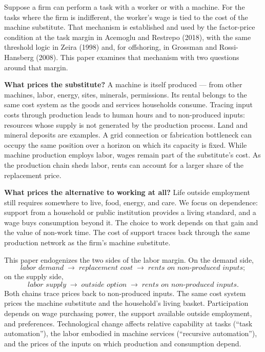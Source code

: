 \documentclass[12pt]{article}
\theoremstyle{plain}
\theoremstyle{definition}
\theoremstyle{remark}
\begin{document}
Suppose a firm can perform a task with a worker or with a machine. For the tasks where the firm is indifferent, the worker's wage is tied to the cost of the machine substitute. That mechanism is established and used by the factor-price condition at the task margin in Acemoglu and Restrepo (2018), with the same threshold logic in Zeira (1998) and, for offshoring, in Grossman and Rossi-Hansberg (2008). This paper examines that mechanism with two questions around that margin.

\textbf{What prices the substitute?} A machine is itself produced --- from other machines, labor, energy, sites, minerals, permissions. Its rental belongs to the same cost system as the goods and services households consume. Tracing input costs through production leads to human hours and to non-produced inputs: resources whose supply is not generated by the production process. Land and mineral deposits are examples. A grid connection or fabrication bottleneck can occupy the same position over a horizon on which its capacity is fixed. While machine production employs labor, wages remain part of the substitute's cost. As the production chain sheds labor, rents can account for a larger share of the replacement price.

\textbf{What prices the alternative to working at all?} Life outside employment still requires somewhere to live, food, energy, and care. We focus on dependence: support from a household or public institution provides a living standard, and a wage buys consumption beyond it. The choice to work depends on that gain and the value of non-work time. The cost of support traces back through the same production network as the firm's machine substitute.

This paper endogenizes the two sides of the labor margin. On the demand side,
\[
\textit{labor demand} \;\to\; \textit{replacement cost} \;\to\; \textit{rents on non-produced inputs};
\]
on the supply side,
\[
\textit{labor supply} \;\to\; \textit{outside option} \;\to\; \textit{rents on non-produced inputs}.
\]
Both chains trace prices back to non-produced inputs. The same cost system prices the machine substitute and the household's living basket. Participation depends on wage purchasing power, the support available outside employment, and preferences. Technological change affects relative capability at tasks (``task automation''), the labor embodied in machine services (``recursive automation''), and the prices of the inputs on which production and consumption depend.
\end{document}
